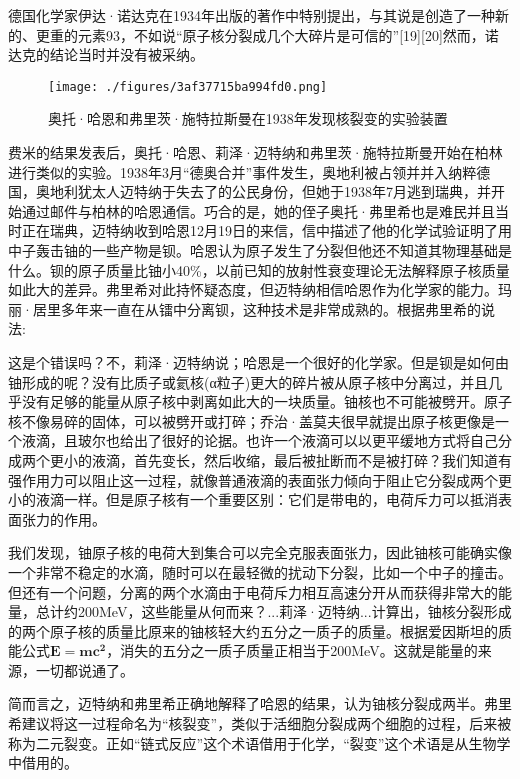 德国化学家伊达·诺达克在1934年出版的著作中特别提出，与其说是创造了一种新的、更重的元素93，不如说“原子核分裂成几个大碎片是可信的”[19][20]然而，诺达克的结论当时并没有被采纳。
\begin{figure}[ht]
\centering
\texttt{[image: ./figures/3af37715ba994fd0.png]}
\caption{奥托·哈恩和弗里茨·施特拉斯曼在1938年发现核裂变的实验装置} \label{fig_HLB_9}
\end{figure}
费米的结果发表后，奥托·哈恩、莉泽·迈特纳和弗里茨·施特拉斯曼开始在柏林进行类似的实验。1938年3月“德奥合并”事件发生，奥地利被占领并并入纳粹德国，奥地利犹太人迈特纳于失去了的公民身份，但她于1938年7月逃到瑞典，并开始通过邮件与柏林的哈恩通信。巧合的是，她的侄子奥托·弗里希也是难民并且当时正在瑞典，迈特纳收到哈恩12月19日的来信，信中描述了他的化学试验证明了用中子轰击铀的一些产物是钡。哈恩认为原子发生了分裂但他还不知道其物理基础是什么。钡的原子质量比铀小40\%，以前已知的放射性衰变理论无法解释原子核质量如此大的差异。弗里希对此持怀疑态度，但迈特纳相信哈恩作为化学家的能力。玛丽·居里多年来一直在从镭中分离钡，这种技术是非常成熟的。根据弗里希的说法:

这是个错误吗？不，莉泽·迈特纳说；哈恩是一个很好的化学家。但是钡是如何由铀形成的呢？没有比质子或氦核(α粒子)更大的碎片被从原子核中分离过，并且几乎没有足够的能量从原子核中剥离如此大的一块质量。铀核也不可能被劈开。原子核不像易碎的固体，可以被劈开或打碎；乔治·盖莫夫很早就提出原子核更像是一个液滴，且玻尔也给出了很好的论据。也许一个液滴可以以更平缓地方式将自己分成两个更小的液滴，首先变长，然后收缩，最后被扯断而不是被打碎？我们知道有强作用力可以阻止这一过程，就像普通液滴的表面张力倾向于阻止它分裂成两个更小的液滴一样。但是原子核有一个重要区别：它们是带电的，电荷斥力可以抵消表面张力的作用。

我们发现，铀原子核的电荷大到集合可以完全克服表面张力，因此铀核可能确实像一个非常不稳定的水滴，随时可以在最轻微的扰动下分裂，比如一个中子的撞击。但还有一个问题，分离的两个水滴由于电荷斥力相互高速分开从而获得非常大的能量，总计约200MeV，这些能量从何而来？...莉泽·迈特纳...计算出，铀核分裂形成的两个原子核的质量比原来的铀核轻大约五分之一质子的质量。根据爱因斯坦的质能公式$\mathbf{E=mc^2}$，消失的五分之一质子质量正相当于200MeV。这就是能量的来源，一切都说通了。

简而言之，迈特纳和弗里希正确地解释了哈恩的结果，认为铀核分裂成两半。弗里希建议将这一过程命名为“核裂变”，类似于活细胞分裂成两个细胞的过程，后来被称为二元裂变。正如“链式反应”这个术语借用于化学，“裂变”这个术语是从生物学中借用的。

